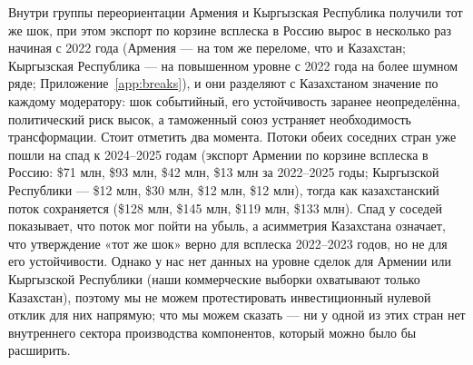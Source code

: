 \documentclass[12pt]{article}
\begin{document}
Внутри группы переориентации Армения и Кыргызская Республика получили тот же шок, при этом
экспорт по корзине всплеска в Россию вырос в несколько раз начиная с 2022 года (Армения —
на том же переломе, что и Казахстан; Кыргызская Республика — на повышенном уровне с 2022
года на более шумном ряде; Приложение~\ref{app:breaks}), и они разделяют с Казахстаном
значение по каждому модератору: шок событийный, его устойчивость заранее неопределённа,
политический риск высок, а таможенный союз устраняет необходимость трансформации. Стоит
отметить два момента. Потоки обеих соседних стран уже пошли на спад к 2024--2025 годам
(экспорт Армении по корзине всплеска в Россию: \$71 млн, \$93 млн, \$42 млн, \$13 млн за
2022--2025 годы; Кыргызской Республики — \$12 млн, \$30 млн, \$12 млн, \$12 млн), тогда как
казахстанский поток сохраняется (\$128 млн, \$145 млн, \$119 млн, \$133 млн). Спад у соседей
показывает, что поток мог пойти на убыль, а асимметрия Казахстана означает, что утверждение
«тот же шок» верно для всплеска 2022--2023 годов, но не для его устойчивости. Однако у нас
нет данных на уровне сделок для Армении или Кыргызской Республики (наши коммерческие
выборки охватывают только Казахстан), поэтому мы не можем протестировать инвестиционный
нулевой отклик для них напрямую; что мы можем сказать — ни у одной из этих стран нет
внутреннего сектора производства компонентов, который можно было бы расширить.
\end{document}
